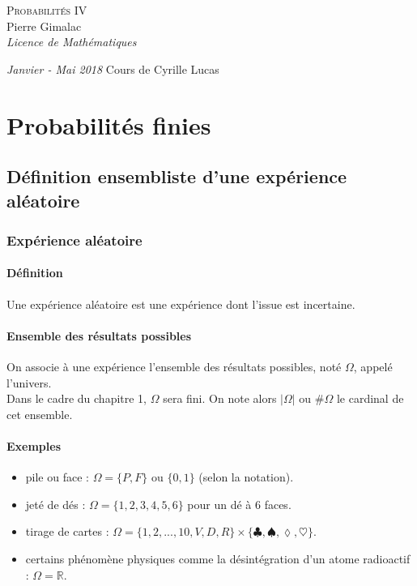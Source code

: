 \documentclass[a4paper,10pt]{book} %
\newcommand{\R}{\mathbb{R}}
\newcommand\abs[1]{\left|#1\right|}
\begin{document}
\begin{titlepage}
\thispagestyle{empty}
\begin{center}
\vspace*{7cm}
\Huge \textsc{Probabilités IV}\\
\vspace{1.5cm}
\Large Pierre Gimalac\\
\vspace{0.5cm}
\large \textit{Licence de Mathématiques}
\vfill
\end{center}
\large \textit{Janvier - Mai 2018}
\hfill 
\large Cours de Cyrille Lucas
\restoregeometry
\end{titlepage}

\renewcommand{\contentsname}{Sommaire}
\thispagestyle{empty}
\tableofcontents
\thispagestyle{empty}

\chapter{Probabilités finies}
\section{Définition ensembliste d'une expérience aléatoire}
\subsection{Expérience aléatoire}
\subsubsection{Définition}
Une expérience aléatoire est une expérience dont l'issue est incertaine.

\subsubsection{Ensemble des résultats possibles}
On associe à une expérience l'ensemble des résultats possibles, noté $\Omega$, appelé l'univers.\\

Dans le cadre du chapitre 1, $\Omega$ sera fini. On note alors $\abs{\Omega}$ ou $\#\Omega$ le cardinal de cet ensemble.

\subsubsection{Exemples}
\begin{itemize}
\item pile ou face : $\Omega=\{P,F\}$ ou $\{0,1\}$ (selon la notation).
\item jeté de dés : $\Omega=\{1,2,3,4,5,6\}$ pour un dé à 6 faces.
\item tirage de cartes : $\Omega=\{1,2,...,10,V,D,R\}\times \{\clubsuit,\spadesuit,\lozenge,\heartsuit\}$.
\item certains phénomène physiques comme la désintégration d'un atome radioactif : $\Omega=\R$.
\end{itemize}
\end{document}
